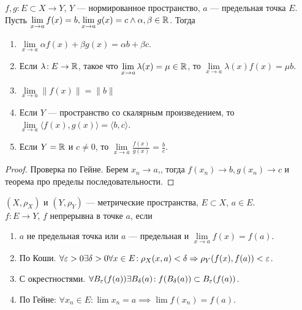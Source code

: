 \begin{theorem}
    $f, g\!: E \subset X \to Y$,  $Y$ --- нормированное пространство,  $a$ --- предельная точка  $E$.\\
    Пусть  $\lim\limits_{x \to a} f(x) = b, \lim\limits_{x\to a} g(x) = c \land \alpha, \beta \in \mathbb{R}$. Тогда

     \begin{enumerate}
         \item $\lim\limits_{x \to a} \alpha f(x) + \beta g(x) = \alpha b + \beta c$.
         \item Если  $\lambda\!: E \to \mathbb{R}$, такое что  $\lim\limits_{x \to a} \lambda(x) = \mu \in \mathbb{R}$, то  $\lim\limits_{x \to a} \lambda(x) f(x) = \mu b$.
         \item  $\lim\limits_{x \to a} \lVert f(x) \rVert = \lVert b \rVert$
         \item Если  $Y$ --- пространство со скалярным произведением, то  $\lim\limits_{x \to a} \langle f(x), g(x) \rangle = \langle b, c \rangle$.
         \item Если $Y = \mathbb{R}$ и  $c \neq 0$, то  $\lim\limits_{x \to a} \frac{f(x)}{g(x)} = \frac{b}{c}$. 
    \end{enumerate}
\end{theorem}
\begin{proof}
    Проверка по Гейне. Берем $x_n \to a$,, тогда  $f(x_n) \to b, g(x_n) \to c$ и теорема про пределы последовательности.
\end{proof}
\begin{definition}
    $(X, \rho_X)$ и  $(Y,\rho_Y)$ --- метрические пространства, $E \subset X$,  $a \in E$.\\
     $f\!: E \to Y$,  $f$ непрерывна в точке  $a$, если
      \begin{enumerate}
          \item $a$ не предельная точка или  $a$ --- предельная и  $\lim\limits_{x \to a} f(x) = f(a)$.
          \item По Коши.  $\forall \varepsilon > 0 \exists \delta > 0 \forall x \in E\!: \rho_X(x, a) < \delta \Rightarrow \rho_Y(f(x), f(a)) < \varepsilon$.
          \item С окрестностями.  $\forall B_\varepsilon(f(a)) \exists B_\delta(a)\!: f(B_\delta(a)) \subset B_\varepsilon(f(a))$.
          \item По Гейне:  $\forall x_n \in E\!: \lim x_n = a \implies \lim f(x_n) = f(a)$.
     \end{enumerate}
\end{definition}
